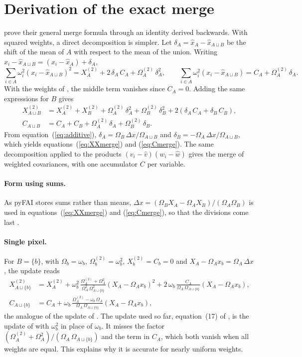 \documentclass{iucrjournals}
\newcommand{\mean}[1]{\widehat{#1}}
\newcommand{\Om}{\Omega}
\newcommand{\OmS}{\Omega^{(2)}}
\newcommand{\XX}{X^{(2)}}
\newcommand{\AB}{{A\sqcup B}}
\newcommand{\Ab}{{A\sqcup\{b\}}}
\begin{document}
\appendix
\section{Derivation of the exact merge}
\label{app:derivation}

 prove their general merge formula through an identity derived backwards.
With squared weights, a direct decomposition is simpler.
Let $\delta_A=\mean{x}_A-\mean{x}_\AB$ be the shift of the mean of $A$ with respect to the mean of the union.
Writing $x_i-\mean{x}_\AB=(x_i-\mean{x}_A)+\delta_A$,
\begin{equation}
  \sum_{i\in A}\omega_i^2\left(x_i-\mean{x}_\AB\right)^2 = \XX_A + 2\,\delta_A\,C_A + \OmS_A\,\delta_A^2 ,
  \qquad
  \sum_{i\in A}\omega_i^2\left(x_i-\mean{x}_\AB\right) = C_A + \OmS_A\,\delta_A .
\end{equation}
With the weights of , the middle term vanishes since $C_A=0$.
Adding the same expressions for $B$ gives
\begin{align}
  \XX_\AB &= \XX_A + \XX_B + \OmS_A\,\delta_A^2 + \OmS_B\,\delta_B^2 + 2\left(\delta_A\,C_A+\delta_B\,C_B\right),\\
  C_\AB  &= C_A + C_B + \OmS_A\,\delta_A + \OmS_B\,\delta_B .
\end{align}
From equation~(\ref{eq:additive}), $\delta_A=\Om_B\,\Delta x/\Om_\AB$ and $\delta_B=-\Om_A\,\Delta x/\Om_\AB$, which yields equations~(\ref{eq:XXmerge}) and (\ref{eq:Cmerge}).
The same decomposition applied to the products $(v_i-\mean{v})(w_i-\mean{w})$ gives the merge of weighted covariances, with one accumulator $C$ per variable.

\paragraph{Form using sums.}
As pyFAI stores sums rather than means, $\Delta x=(\Om_B X_A-\Om_A X_B)/(\Om_A\Om_B)$ is used in equations~(\ref{eq:XXmerge}) and (\ref{eq:Cmerge}), so that the divisions come last \cite{Schubert2018}.

\paragraph{Single pixel.}
For $B=\{b\}$, with $\Om_b=\omega_b$, $\OmS_b=\omega_b^2$, $\XX_b=C_b=0$ and $X_A-\Om_A x_b = \Om_A\,\Delta x$, the update reads
\begin{align}
  \XX_\Ab &= \XX_A + \omega_b^2\,\frac{\OmS_A+\Om_A^2}{\Om_A^2\,\Om_\Ab^2}\left(X_A-\Om_A x_b\right)^2
            + 2\,\omega_b\,\frac{C_A}{\Om_A\,\Om_\Ab}\left(X_A-\Om_A x_b\right), \\
  C_\Ab  &= C_A + \omega_b\,\frac{\OmS_A-\omega_b\,\Om_A}{\Om_A\,\Om_\Ab}\left(X_A-\Om_A x_b\right),
\end{align}
the analogue of the update of .
The update used so far, equation~(17) of , is the update of  with $\omega_b^2$ in place of $\omega_b$.
It misses the factor $(\OmS_A+\Om_A^2)/(\Om_A\,\Om_\Ab)$ and the term in $C_A$, which both vanish when all weights are equal.
This explains why it is accurate for nearly uniform weights.
\end{document}

